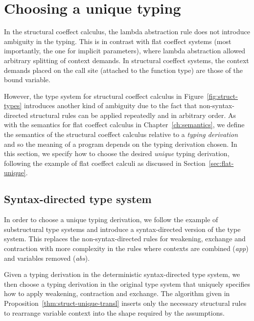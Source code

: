 
\section{Choosing a unique typing}
\label{sec:struct-unique}

In the structural coeffect calculus, the lambda abstraction rule does not introduce ambiguity
in the typing. This is in contrast with flat coeffect systems (most importantly, the one for
implicit parameters), where lambda abstraction allowed arbitrary splitting of context demands.
In structural coeffect systems, the context demands placed on the call site (attached to
the function type) are those of the bound variable.

However, the type system for structural coeffect calculus in Figure~\ref{fig:struct-types}
introduces another kind of ambiguity due to the fact that non-syntax-directed structural rules
can be applied repeatedly and in arbitrary order. As with the semantics for flat coeffect calculus
in Chapter~\ref{ch:semantics}, we define the semantics of the structural coeffect calculus relative to
a \emph{typing derivation} and so the meaning of a program depends on the typing derivation chosen.
In this section, we specify how to choose the desired \emph{unique} typing derivation, following
the example of flat coeffect calculi as discussed in Section~\ref{sec:flat-unique}.


\subsection{Syntax-directed type system}

In order to choose a unique typing derivation, we follow the example of substructural type systems
\cite{substruct-attpl-intro} and introduce a syntax-directed version of the type system.
This replaces the non-syntax-directed rules for weakening, exchange and contraction with
more complexity in the rules where contexts are combined  (\emph{app}) and variables removed (\emph{abs}).

Given a typing derivation in the deterministic syntax-directed type system, we then choose a
typing derivation in the original type system that uniquely specifies how to apply weakening,
contraction and exchange. The algorithm given in Proposition~\ref{thm:struct-unique-transl}
inserts only the necessary structural rules to rearrange variable context into the shape
required by the assumptions.

